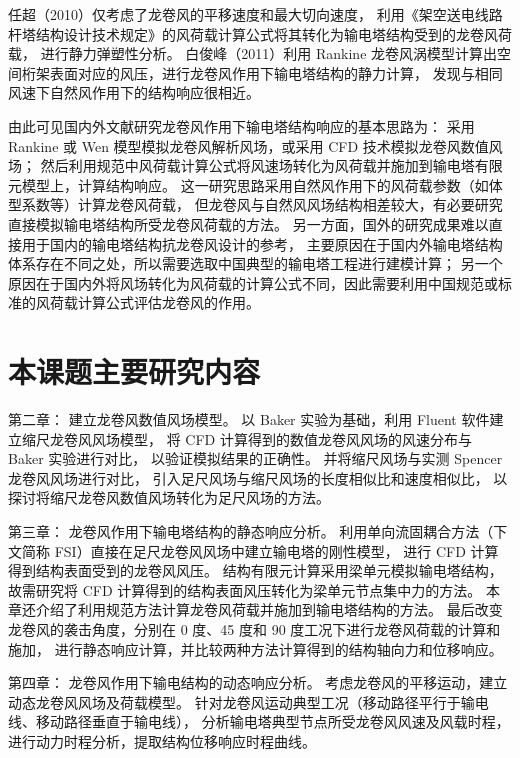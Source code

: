 任超（2010）\cite{ren2010tower}仅考虑了龙卷风的平移速度和最大切向速度，
利用《架空送电线路杆塔结构设计技术规定》的风荷载计算公式将其转化为输电塔结构受到的龙卷风荷载，
进行静力弹塑性分析。
白俊峰（2011）\cite{bai2011tornado}利用 Rankine 龙卷风涡模型计算出空间桁架表面对应的风压，进行龙卷风作用下输电塔结构的静力计算，
发现与相同风速下自然风作用下的结构响应很相近。

由此可见国内外文献研究龙卷风作用下输电塔结构响应的基本思路为：
采用 Rankine 或 Wen 模型模拟龙卷风解析风场，或采用 CFD 技术模拟龙卷风数值风场；
然后利用规范中风荷载计算公式将风速场转化为风荷载并施加到输电塔有限元模型上，计算结构响应。
这一研究思路采用自然风作用下的风荷载参数（如体型系数等）计算龙卷风荷载，
但龙卷风与自然风风场结构相差较大，有必要研究直接模拟输电塔结构所受龙卷风荷载的方法。
另一方面，国外的研究成果难以直接用于国内的输电塔结构抗龙卷风设计的参考，
主要原因在于国内外输电塔结构体系存在不同之处，所以需要选取中国典型的输电塔工程进行建模计算；
另一个原因在于国内外将风场转化为风荷载的计算公式不同，因此需要利用中国规范或标准的风荷载计算公式评估龙卷风的作用。

\section{本课题主要研究内容}

第二章：
建立龙卷风数值风场模型。
以 Baker 实验为基础，利用 Fluent 软件建立缩尺龙卷风风场模型，
将 CFD 计算得到的数值龙卷风风场的风速分布与 Baker 实验进行对比，
以验证模拟结果的正确性。
并将缩尺风场与实测 Spencer 龙卷风风场进行对比，
引入足尺风场与缩尺风场的长度相似比和速度相似比，
以探讨将缩尺龙卷风数值风场转化为足尺风场的方法。

第三章：
龙卷风作用下输电塔结构的静态响应分析。
利用单向流固耦合方法（下文简称 FSI）直接在足尺龙卷风风场中建立输电塔的刚性模型，
进行 CFD 计算得到结构表面受到的龙卷风风压。
结构有限元计算采用梁单元模拟输电塔结构，故需研究将 CFD 计算得到的结构表面风压转化为梁单元节点集中力的方法。
本章还介绍了利用规范方法计算龙卷风荷载并施加到输电塔结构的方法。
最后改变龙卷风的袭击角度，分别在 0 度、45 度和 90 度工况下进行龙卷风荷载的计算和施加，
进行静态响应计算，并比较两种方法计算得到的结构轴向力和位移响应。

第四章：
龙卷风作用下输电结构的动态响应分析。
考虑龙卷风的平移运动，建立动态龙卷风风场及荷载模型。
针对龙卷风运动典型工况（移动路径平行于输电线、移动路径垂直于输电线），
分析输电塔典型节点所受龙卷风风速及风载时程，进行动力时程分析，提取结构位移响应时程曲线。
